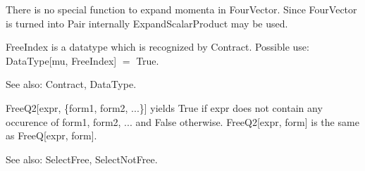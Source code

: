 \dispSFoutmath{
\mu
}

\dispSFinmath{
\mu
}








There is no special function to expand momenta in FourVector. Since FourVector is turned into Pair internally ExpandScalarProduct may be
  used.





FreeIndex is a datatype which is recognized by Contract. Possible use: DataType[mu, FreeIndex] \(=\) True.

See also:  Contract, DataType.



FreeQ2[expr, \{form1, form2, ...\}] yields True if expr does not contain any occurence of form1, form2, ... and False otherwise.
  FreeQ2[expr, form] is the same as FreeQ[expr, form].

See also:  SelectFree, SelectNotFree.







